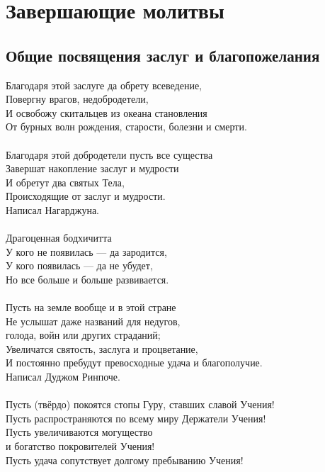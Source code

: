 
\section{Завершающие молитвы}

\subsection{Общие посвящения заслуг и благопожелания}

Благодаря этой заслуге да обрету всеведение,\\
Повергну врагов, недобродетели,\\
И освобожу скитальцев из океана становления \\
От бурных волн рождения, старости, болезни и смерти.\\
\\
Благодаря этой добродетели пусть все существа\\
Завершат накопление заслуг и мудрости \\
И обретут два святых Тела,\\
Происходящие от заслуг и мудрости.\\
\scriptsize
Написал Нагарджуна.\\
\normalsize
\\
Драгоценная бодхичитта\\
У кого не появилась — да зародится,\\
У кого появилась — да не убудет,\\
Но все больше и больше развивается.\\
\\
Пусть на земле вообще и в этой стране\\
Не услышат даже названий для недугов, \\ \indent голода, войн или других страданий;\\
Увеличатся святость, заслуга и процветание,\\
И постоянно пребудут превосходные удача и благополучие.\\
\scriptsize
Написал Дуджом Ринпоче.\\
\normalsize
\\
Пусть (твёрдо) покоятся стопы Гуру, ставших славой Учения!\\
Пусть распространяются по всему миру Держатели Учения!\\
Пусть увеличиваются могущество \\ \indent и богатство покровителей Учения!\\
Пусть удача сопутствует долгому пребыванию Учения!\\
\\
\newpage
